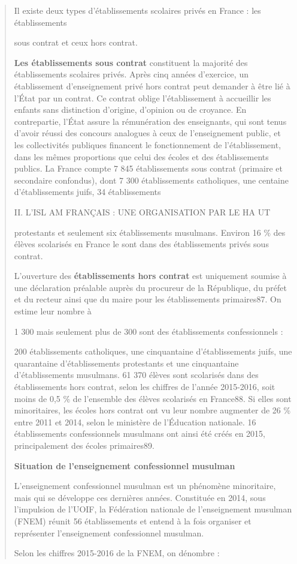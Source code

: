 \begin{quote}
Il existe deux types d'établissements scolaires privés en France : les
établissements

sous contrat et ceux hors contrat.

\textbf{Les établissements sous contrat} constituent la majorité des
établissements scolaires privés. Après cinq années d'exercice, un
établissement d'enseignement privé hors contrat peut demander à être lié
à l'État par un contrat. Ce contrat oblige l'établissement à accueillir
les enfants sans distinction d'origine, d'opinion ou de croyance. En
contrepartie, l'État assure la rémunération des enseignants, qui sont
tenus d'avoir réussi des concours analogues à ceux de l'enseignement
public, et les collectivités publiques financent le fonctionnement de
l'établissement, dans les mêmes proportions que celui des écoles et des
établissements publics. La France compte 7 845 établissements sous
contrat (primaire et secondaire confondus), dont 7 300 établissements
catholiques, une centaine d'établissements juifs, 34 établissements

II. L'ISL AM FRANÇAIS : UNE ORGANISATION PAR LE HA UT

protestants et seulement six établissements musulmans. Environ 16 \% des
élèves scolarisés en France le sont dans des établissements privés sous
contrat.

L'ouverture des \textbf{établissements hors contrat} est uniquement
soumise à une déclaration préalable auprès du procureur de la
République, du préfet et du recteur ainsi que du maire pour les
établissements primaires87. On estime leur nombre à

1 300 mais seulement plus de 300 sont des établissements confessionnels
:

200 établissements catholiques, une cinquantaine d'établissements juifs,
une quarantaine d'établissements protestants et une cinquantaine
d'établissements musulmans. 61 370 élèves sont scolarisés dans des
établissements hors contrat, selon les chiffres de l'année 2015-2016,
soit moins de 0,5 \% de l'ensemble des élèves scolarisés en France88. Si
elles sont minoritaires, les écoles hors contrat ont vu leur nombre
augmenter de 26 \% entre 2011 et 2014, selon le ministère de l'Éducation
nationale. 16 établissements confessionnels musulmans ont ainsi été
créés en 2015, principalement des écoles primaires89.

\textbf{Situation de l'enseignement confessionnel musulman}

L'enseignement confessionnel musulman est un phénomène minoritaire, mais
qui se développe ces dernières années. Constituée en 2014, sous
l'impulsion de l'UOIF, la Fédération nationale de l'enseignement
musulman (FNEM) réunit 56 établissements et entend à la fois organiser
et représenter l'enseignement confessionnel musulman.

Selon les chiffres 2015-2016 de la FNEM, on dénombre :
\end{quote}

